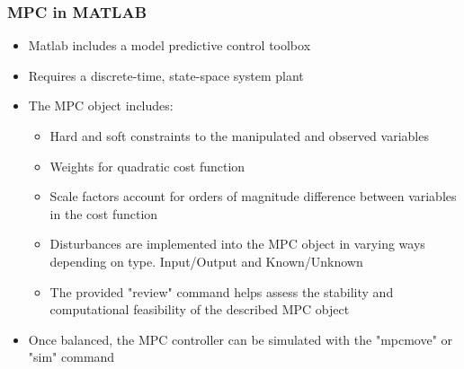 \documentclass[aspectratio=169]{beamer}
\begin{document}
\begin{frame}[t]
    \frametitle{MPC in MATLAB}
    \begin{itemize}
        \item Matlab includes a model predictive control toolbox
        \item Requires a discrete-time, state-space system plant
        \item The MPC object includes:
        \begin{itemize}
            \item Hard and soft constraints to the manipulated and observed variables
            \item Weights for quadratic cost function
            \item Scale factors account for orders of magnitude difference between variables in the cost function
            \item Disturbances are implemented into the MPC object in varying ways depending on type. Input/Output and Known/Unknown
            \item The provided "review" command helps assess the stability and computational feasibility of the described MPC object
        \end{itemize}
        \item Once balanced, the MPC controller can be simulated with the "mpcmove" or "sim" command
    \end{itemize}
\end{frame}
\end{document}
